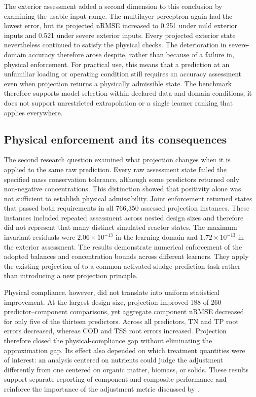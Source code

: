The exterior assessment added a second dimension to this conclusion by examining the usable input range. The multilayer perceptron again had the lowest error, but its projected nRMSE increased to 0.251 under mild exterior inputs and 0.521 under severe exterior inputs. Every projected exterior state nevertheless continued to satisfy the physical checks. The deterioration in severe-domain accuracy therefore arose despite, rather than because of a failure in, physical enforcement. For practical use, this means that a prediction at an unfamiliar loading or operating condition still requires an accuracy assessment even when projection returns a physically admissible state. The benchmark therefore supports model selection within declared data and domain conditions; it does not support unrestricted extrapolation or a single learner ranking that applies everywhere.

\subsection{Physical enforcement and its consequences}

The second research question examined what projection changes when it is applied to the same raw prediction. Every raw assessment state failed the specified mass conservation tolerance, although some predictors returned only non-negative concentrations. This distinction showed that positivity alone was not sufficient to establish physical admissibility. Joint enforcement returned states that passed both requirements in all 766,350 assessed projection instances. These instances included repeated assessment across nested design sizes and therefore did not represent that many distinct simulated reactor states. The maximum invariant residuals were $2.06\times10^{-13}$ in the learning domain and $1.72\times10^{-13}$ in the exterior assessment. The results demonstrate numerical enforcement of the adopted balances and concentration bounds across different learners. They apply the existing projection of \citet{KircherVotsmeier2025} to a common activated sludge prediction task rather than introducing a new projection principle.

Physical compliance, however, did not translate into uniform statistical improvement. At the largest design size, projection improved 188 of 260 predictor--component comparisons, yet aggregate component nRMSE decreased for only five of the thirteen predictors. Across all predictors, TN and TP root errors decreased, whereas COD and TSS root errors increased. Projection therefore closed the physical-compliance gap without eliminating the approximation gap. Its effect also depended on which treatment quantities were of interest: an analysis centered on nutrients could judge the adjustment differently from one centered on organic matter, biomass, or solids. These results support separate reporting of component and composite performance and reinforce the importance of the adjustment metric discussed by \citet{SturmSilva2024}.

